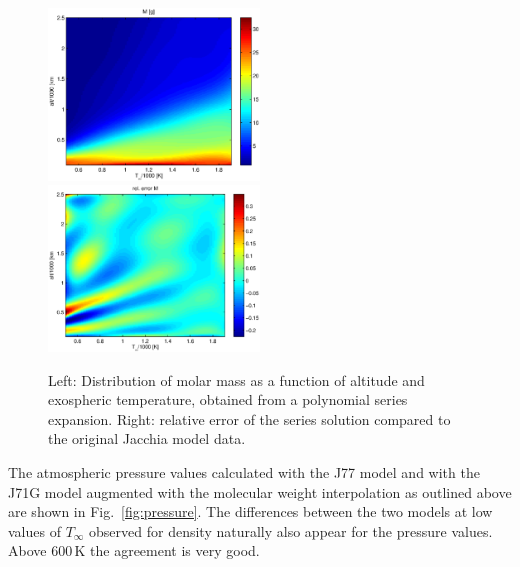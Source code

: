 \documentclass[a4paper]{article}
\begin{document}
\begin{figure}
\includegraphics[width=0.5\textwidth]{molmass.eps}
\includegraphics[width=0.5\textwidth]{molmass_err.eps}
\caption{Left: Distribution of molar mass as a function of altitude and exospheric temperature, obtained from a polynomial series expansion. Right: relative error of the series solution compared to the original Jacchia model data.}
\label{fig:molmass}
\end{figure}
The atmospheric pressure values calculated with the J77 model and with the J71G model augmented with the molecular weight interpolation as outlined above are shown in Fig.~\ref{fig:pressure}. The differences between the two models at low values of $T_\infty$ observed for density naturally also appear for the pressure values. Above 600\,K the agreement is very good.
\end{document}
